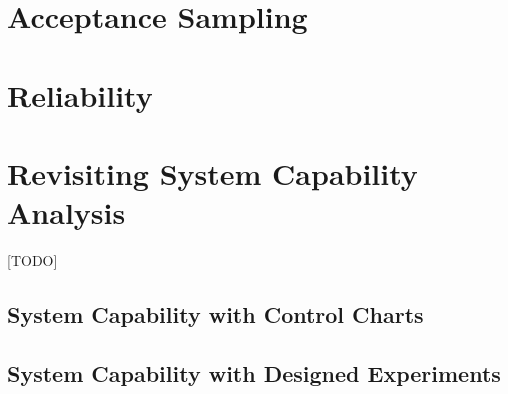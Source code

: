 \documentclass[12pt,a4paper]{report}
\begin{document}
\chapter{Acceptance Sampling}




\chapter{Reliability}




\chapter{Revisiting System Capability Analysis}
\label{sec:advanced_capability_analysis}
[TODO]
\section{System Capability with Control Charts}
\section{System Capability with Designed Experiments}




\newpage

\appendix







\newpage
{}


%
\label{sec:bibliography}
\end{document}
